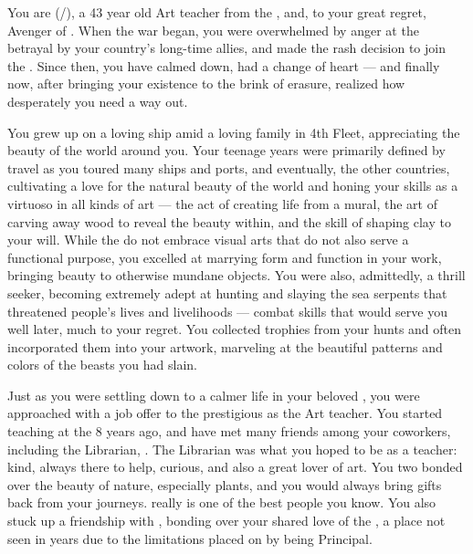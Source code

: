 \documentclass[char]{GL2020}
\begin{document}
\name{\cChupAvenger{}}

You are \cChupAvenger{\full} (\cChupAvenger{\they}/\cChupAvenger{\them}), a 43 year old Art teacher from the \pShip{}, and, to your great regret, Avenger of \cGenesis{}. When the war began, you were overwhelmed by anger at the betrayal by your country's long-time allies, and made the rash decision to join the \pGoaties{}. Since then, you have calmed down, had a change of heart — and finally now, after bringing your existence to the brink of erasure, realized how desperately you need a way out.

You grew up on a loving ship amid a loving family in 4th Fleet, appreciating the beauty of the world around you. Your teenage years were primarily defined by travel as you toured many ships and ports, and eventually, the other countries, cultivating a love for the natural beauty of the world and honing your skills as a virtuoso in all kinds of art — the act of creating life from a mural, the art of carving away wood to reveal the beauty within, and the skill of shaping clay to your will. While the \pShippies{} do not embrace visual arts that do not also serve a functional purpose, you excelled at marrying form and function in your work, bringing beauty to otherwise mundane objects. You were also, admittedly, a thrill seeker, becoming extremely adept at hunting and slaying the sea serpents that threatened people’s lives and livelihoods — combat skills that would serve you well later, much to your regret. You collected trophies from your hunts and often incorporated them into your artwork, marveling at the beautiful patterns and colors of the beasts you had slain.

Just as you were settling down to a calmer life in your beloved \pShip{}, you were approached with a job offer to the prestigious \pSchool{} as the Art teacher. You started teaching at the \pSc{} 8 years ago, and have met many friends among your coworkers, including the Librarian, \cLibrarian{\full}. The Librarian was what you hoped to be as a teacher: kind, always there to help, curious, and also a great lover of art. You two bonded over the beauty of nature, especially plants, and you would always bring gifts back from your journeys. \cLibrarian{} really is one of the best people you know. You also stuck up a friendship with \cPrincipal{\full}, bonding over your shared love of the \pShippies{}, a place \cPrincipal{\they} \cPrincipal{\have} not seen in years due to the limitations placed on \cPrincipal{\them} by being Principal.
\end{document}
